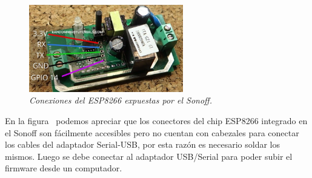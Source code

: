 \begin{figure}[h]
  \centering
  \includegraphics[width=0.6\textwidth, keepaspectratio]{images/sonoff-gpio}
  \caption{\textit{Conexiones del ESP8266 expuestas por el Sonoff.}}
  \label{fig:sonoff-gpio}
\end{figure}
En la figura~ podemos apreciar que los conectores del chip ESP8266 integrado en el Sonoff son fácilmente accesibles pero no cuentan con cabezales para conectar los cables del adaptador Serial-USB, por esta razón es necesario soldar los mismos.
Luego se debe conectar al adaptador USB/Serial para poder subir el firmware desde un computador. 

